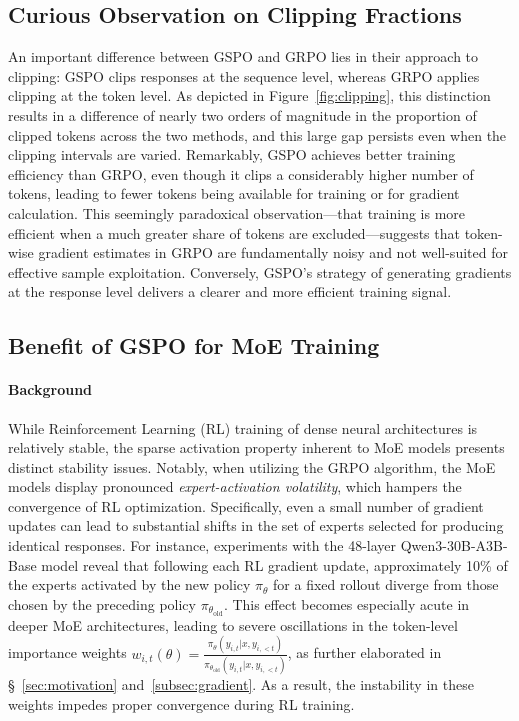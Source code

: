 \subsection{Curious Observation on Clipping Fractions}

An important difference between GSPO and GRPO lies in their approach to clipping: GSPO clips responses at the sequence level, whereas GRPO applies clipping at the token level. As depicted in Figure~\ref{fig:clipping}, this distinction results in a difference of nearly two orders of magnitude in the proportion of clipped tokens across the two methods, and this large gap persists even when the clipping intervals are varied. Remarkably, GSPO achieves better training efficiency than GRPO, even though it clips a considerably higher number of tokens, leading to fewer tokens being available for training or for gradient calculation. This seemingly paradoxical observation—that training is more efficient when a much greater share of tokens are excluded—suggests that token-wise gradient estimates in GRPO are fundamentally noisy and not well-suited for effective sample exploitation. Conversely, GSPO’s strategy of generating gradients at the response level delivers a clearer and more efficient training signal.

\subsection{Benefit of GSPO for MoE Training}
\label{subsec:routing_replay}

\paragraph{Background}
While Reinforcement Learning (RL) training of dense neural architectures is relatively stable, the sparse activation property inherent to MoE models presents distinct stability issues. Notably, when utilizing the GRPO algorithm, the MoE models display pronounced \textit{expert-activation volatility}, which hampers the convergence of RL optimization. Specifically, even a small number of gradient updates can lead to substantial shifts in the set of experts selected for producing identical responses. For instance, experiments with the 48-layer Qwen3-30B-A3B-Base model reveal that following each RL gradient update, approximately 10\% of the experts activated by the new policy $\pi_{\theta}$ for a fixed rollout diverge from those chosen by the preceding policy $\pi_{\theta_\text{old}}$. This effect becomes especially acute in deeper MoE architectures, leading to severe oscillations in the token-level importance weights $w_{i,t}(\theta) = \frac{ \pi_{\theta} (y_{i,t} | x, y_{i,<t}) }{ \pi_{\theta_\text{old}} (y_{i,t} | x,y_{i,<t})}$, as further elaborated in \S~\ref{sec:motivation} and~\ref{subsec:gradient}. As a result, the instability in these weights impedes proper convergence during RL training.

